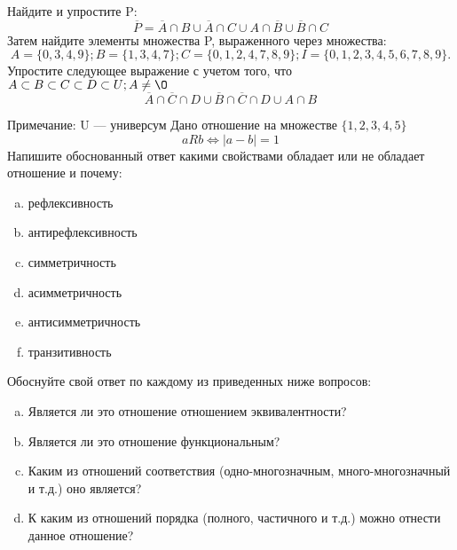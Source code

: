 \documentclass[10pt]{exam}
\begin{document}
\begin{questions}
\question
Найдите и упростите P:
\begin{equation*}
\overline{P} = \overline{A} \cap B \cup \overline{A} \cap C \cup A \cap \overline{B} \cup \overline{B} \cap C
\end{equation*}
Затем найдите элементы множества P, выраженного через множества:
\begin{equation*}
A = \{0, 3, 4, 9\}; 
B = \{1, 3, 4, 7\};
C = \{0, 1, 2, 4, 7, 8, 9\};
I = \{0, 1, 2, 3, 4, 5, 6, 7, 8, 9\}.
\end{equation*}\question
Упростите следующее выражение с учетом того, что $A\subset B \subset C \subset D \subset U; A \neq \O$
\begin{equation*}
\overline{A} \cap \overline{C} \cap D \cup \overline{B} \cap \overline{C} \cap D \cup A \cap B
\end{equation*}

Примечание: U — универсум\question
Дано отношение на множестве $\{1, 2, 3, 4, 5\}$ 
\begin{equation*}
aRb \iff |a-b| = 1
\end{equation*}
Напишите обоснованный ответ какими свойствами обладает или не обладает отношение и почему:   
\begin{enumerate} [a)]\setcounter{enumi}{0}
\item рефлексивность
\item антирефлексивность
\item симметричность
\item асимметричность
\item антисимметричность
\item транзитивность
\end{enumerate}

Обоснуйте свой ответ по каждому из приведенных ниже вопросов:
\begin{enumerate} [a)]\setcounter{enumi}{0}
    \item Является ли это отношение отношением эквивалентности?
    \item Является ли это отношение функциональным?
    \item Каким из отношений соответствия (одно-многозначным, много-многозначный и т.д.) оно является?
    \item К каким из отношений порядка (полного, частичного и т.д.) можно отнести данное отношение?
\end{enumerate}


\end{questions}
\end{document}
